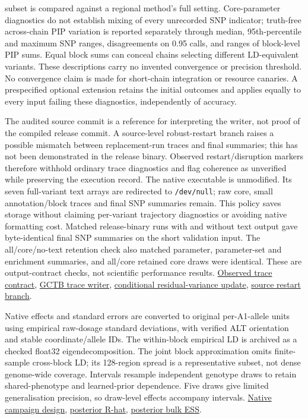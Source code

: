 \documentclass[
  british,
  10pt,
]{article}
\begin{document}
subset is compared against a regional method's full setting.
Core-parameter diagnostics do not establish mixing of every unrecorded
SNP indicator; truth-free across-chain PIP variation is reported
separately through median, 95th-percentile and maximum SNP ranges,
disagreements on 0.95 calls, and ranges of block-level PIP sums. Equal
block sums can conceal chains selecting different LD-equivalent
variants. These descriptions carry no invented convergence or precision
threshold. No convergence claim is made for short-chain integration or
resource canaries. A prespecified optional extension retains the initial
outcomes and applies equally to every input failing these diagnostics,
independently of accuracy.

The audited source commit is a reference for interpreting the writer,
not proof of the compiled release commit. A source-level robust-restart
branch raises a possible mismatch between replacement-run traces and
final summaries; this has not been demonstrated in the release binary.
Observed restart/disruption markers therefore withhold ordinary trace
diagnostics and flag coherence as unverified while preserving the
execution record. The native executable is unmodified. Its seven
full-variant text arrays are redirected to \texttt{/dev/null}; raw core,
small annotation/block traces and final SNP summaries remain. This
policy saves storage without claiming per-variant trajectory diagnostics
or avoiding native formatting cost. Matched release-binary runs with and
without text output gave byte-identical final SNP summaries on the short
validation input. The all/core/no-text retention check also matched
parameter, parameter-set and enrichment summaries, and all/core retained
core draws were identical. These are output-contract checks, not
scientific performance results.
\href{../scripts/native/campaign/trace-contract.json}{Observed trace
contract},
\href{https://github.com/jianzeng/GCTB/blob/cc7fa7d765c83a89c6375946cf77fe50ba1a317e/scr/mcmc.cpp}{GCTB
trace writer},
\href{https://github.com/jianzeng/GCTB/blob/cc7fa7d765c83a89c6375946cf77fe50ba1a317e/scr/model.cpp\#L2141-L2155}{conditional
residual-variance update},
\href{https://github.com/jianzeng/GCTB/blob/cc7fa7d765c83a89c6375946cf77fe50ba1a317e/scr/main.cpp\#L255-L276}{source
restart branch}.

Native effects and standard errors are converted to original
per-A1-allele units using empirical raw-dosage standard deviations, with
verified ALT orientation and stable coordinate/allele IDs. The
within-block empirical LD is archived as a checked float32
eigendecomposition. The joint block approximation omits finite-sample
cross-block LD; its 128-region spread is a representative subset, not
dense genome-wide coverage. Intervals resample independent genotype
draws to retain shared-phenotype and learned-prior dependence. Five
draws give limited generalisation precision, so draw-level effects
accompany intervals. \href{../scripts/native/campaign/README.md}{Native
campaign design},
\href{https://mc-stan.org/posterior/reference/rhat.html}{posterior
R-hat},
\href{https://mc-stan.org/posterior/reference/ess_bulk.html}{posterior
bulk ESS}.
\end{document}
